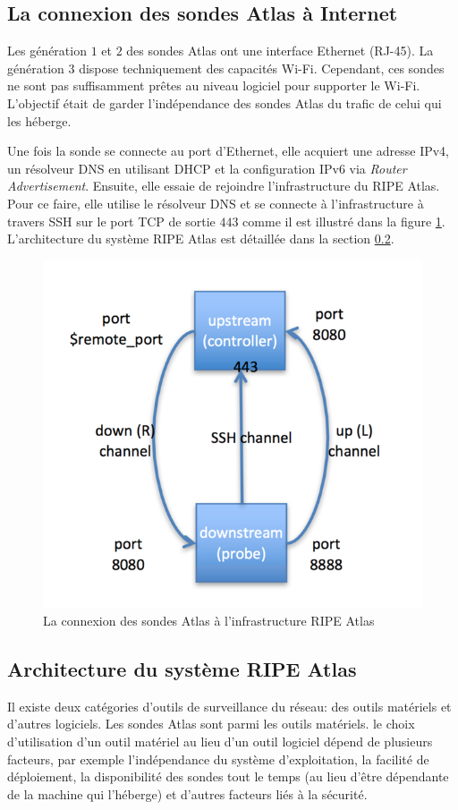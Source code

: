 \subsection{La connexion des sondes Atlas à Internet}

Les génération $1$ et $2$ des sondes  Atlas ont une interface Ethernet (RJ-45). La génération $3$ dispose techniquement des capacités Wi-Fi. Cependant, ces sondes ne sont pas suffisamment prêtes au niveau logiciel pour supporter le Wi-Fi. L'objectif était de garder l'indépendance des sondes Atlas du trafic de celui qui les héberge.

Une fois la sonde se connecte au port d'Ethernet, elle acquiert  une adresse IPv4, un résolveur DNS  en utilisant DHCP et la configuration IPv6 via \textit{Router Advertisement}. Ensuite, elle essaie de rejoindre l'infrastructure du RIPE Atlas. Pour ce faire, elle utilise le résolveur DNS et se connecte à l'infrastructure à travers SSH sur le port TCP de sortie $443$ comme il est illustré dans la figure \ref{fig:ssh-atlas-probe}. L'architecture du système RIPE Atlas est détaillée dans la section \ref{subsec:archi-probes}.

\begin{figure}[H]
	\centering
	\captionsetup{justification=centering}
	\includegraphics[width=0.5\linewidth]{illustrations/ssh-atlas-probe}
	\caption{La connexion des sondes Atlas à l'infrastructure RIPE Atlas \cite{how-we-manage-our-probe}}
	\label{fig:ssh-atlas-probe}
\end{figure}

\subsection{Architecture du système RIPE Atlas} \label{subsec:archi-probes}

Il existe deux catégories d'outils de surveillance du réseau: des outils matériels et d'autres logiciels. Les sondes  Atlas sont parmi les outils matériels. le choix d'utilisation d'un outil matériel au lieu d'un outil logiciel dépend de plusieurs facteurs, par exemple l'indépendance du système d'exploitation, la facilité de déploiement, la disponibilité des sondes tout le temps (au lieu d'être dépendante de la machine qui l'héberge) et d'autres facteurs liés à la sécurité.

